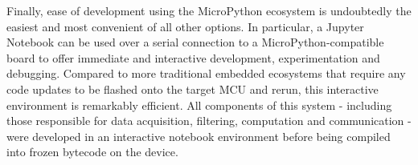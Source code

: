 Finally, ease of development using the MicroPython ecosystem is undoubtedly the easiest and most convenient of all other options. In particular, a Jupyter Notebook can be used over a serial connection to a MicroPython-compatible board to offer immediate and interactive development, experimentation and debugging. Compared to more traditional embedded ecosystems that require any code updates to be flashed onto the target MCU and rerun, this interactive environment is remarkably efficient. All components of this system - including those responsible for data acquisition, filtering, computation and communication - were developed in an interactive notebook environment before being compiled into frozen bytecode on the device.


